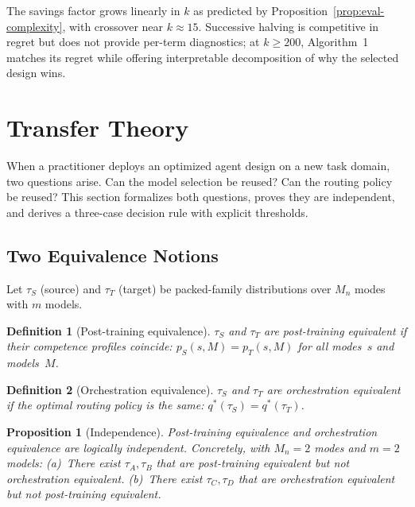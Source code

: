 \documentclass[11pt]{article}
\newtheorem{proposition}{Proposition}
\newtheorem{definition}{Definition}
\newcommand{\Mn}{M_n}
\begin{document}
The savings factor grows linearly in $k$ as predicted by Proposition~\ref{prop:eval-complexity}, with crossover near $k{\approx}15$. Successive halving is competitive in regret but does not provide per-term diagnostics; at $k{\ge}200$, Algorithm~1 matches its regret while offering interpretable decomposition of why the selected design wins.



\section{Transfer Theory}
\label{sec:transfer}

When a practitioner deploys an optimized agent design on a new task
domain, two questions arise.  Can the model selection be reused?  Can the
routing policy be reused?  This section formalizes both questions, proves
they are independent, and derives a three-case decision rule with explicit
thresholds.

\subsection{Two Equivalence Notions}
\label{sec:equivalences}

Let $\tau_S$ (source) and $\tau_T$ (target) be packed-family distributions
over $\Mn$ modes with $m$ models.

\begin{definition}[Post-training equivalence]
\label{def:pt-equiv}
$\tau_S$ and $\tau_T$ are \emph{post-training equivalent} if their
competence profiles coincide:
$p_S(s,M) = p_T(s,M)$ for all modes~$s$ and models~$M$.
\end{definition}

\begin{definition}[Orchestration equivalence]
\label{def:orch-equiv}
$\tau_S$ and $\tau_T$ are \emph{orchestration equivalent} if the optimal
routing policy is the same: $q^*(\tau_S) = q^*(\tau_T)$.
\end{definition}

\begin{proposition}[Independence]
\label{prop:independence}
Post-training equivalence and orchestration equivalence are logically
independent.  Concretely, with $\Mn{=}2$ modes and $m{=}2$ models:
(a)~There exist $\tau_A, \tau_B$ that are post-training equivalent but
  not orchestration equivalent.
(b)~There exist $\tau_C, \tau_D$ that are orchestration equivalent but
  not post-training equivalent.
\end{proposition}
\end{document}

